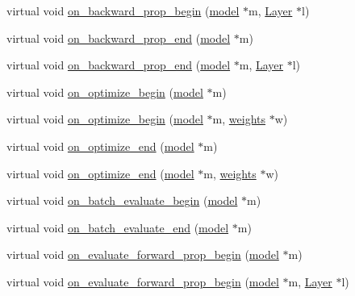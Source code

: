 \begin{DoxyCompactItemize}
\item 
virtual void \hyperlink{classlbann_1_1lbann__callback_abeb1e486e259fd358332abf1e952f630}{on\+\_\+backward\+\_\+prop\+\_\+begin} (\hyperlink{classlbann_1_1model}{model} $\ast$m, \hyperlink{classlbann_1_1Layer}{Layer} $\ast$l)
\item 
virtual void \hyperlink{classlbann_1_1lbann__callback_af183624e63ba65e0003fa988f53dee0c}{on\+\_\+backward\+\_\+prop\+\_\+end} (\hyperlink{classlbann_1_1model}{model} $\ast$m)
\item 
virtual void \hyperlink{classlbann_1_1lbann__callback_aba03b59c056ace8094095c08e39b9ac4}{on\+\_\+backward\+\_\+prop\+\_\+end} (\hyperlink{classlbann_1_1model}{model} $\ast$m, \hyperlink{classlbann_1_1Layer}{Layer} $\ast$l)
\item 
virtual void \hyperlink{classlbann_1_1lbann__callback_a1a9248b305f06419889c1b3b0f0893d8}{on\+\_\+optimize\+\_\+begin} (\hyperlink{classlbann_1_1model}{model} $\ast$m)
\item 
virtual void \hyperlink{classlbann_1_1lbann__callback_a497e750da160e0071ce8864ccc3a1344}{on\+\_\+optimize\+\_\+begin} (\hyperlink{classlbann_1_1model}{model} $\ast$m, \hyperlink{classlbann_1_1weights}{weights} $\ast$w)
\item 
virtual void \hyperlink{classlbann_1_1lbann__callback_a235195d5fa4461835b861a03a5c0278f}{on\+\_\+optimize\+\_\+end} (\hyperlink{classlbann_1_1model}{model} $\ast$m)
\item 
virtual void \hyperlink{classlbann_1_1lbann__callback_a4653e2903bfd3903709a81eaf7eabc1a}{on\+\_\+optimize\+\_\+end} (\hyperlink{classlbann_1_1model}{model} $\ast$m, \hyperlink{classlbann_1_1weights}{weights} $\ast$w)
\item 
virtual void \hyperlink{classlbann_1_1lbann__callback_a3462e54126adbd0082c22c98d8de5468}{on\+\_\+batch\+\_\+evaluate\+\_\+begin} (\hyperlink{classlbann_1_1model}{model} $\ast$m)
\item 
virtual void \hyperlink{classlbann_1_1lbann__callback_ad10891b8ab3de74ee1a70e6255e7d58a}{on\+\_\+batch\+\_\+evaluate\+\_\+end} (\hyperlink{classlbann_1_1model}{model} $\ast$m)
\item 
virtual void \hyperlink{classlbann_1_1lbann__callback_a4a2cff48a688bb56ed14b8b53344f945}{on\+\_\+evaluate\+\_\+forward\+\_\+prop\+\_\+begin} (\hyperlink{classlbann_1_1model}{model} $\ast$m)
\item 
virtual void \hyperlink{classlbann_1_1lbann__callback_a044174864e4981a1dac093d58e8c4d6c}{on\+\_\+evaluate\+\_\+forward\+\_\+prop\+\_\+begin} (\hyperlink{classlbann_1_1model}{model} $\ast$m, \hyperlink{classlbann_1_1Layer}{Layer} $\ast$l)

\end{DoxyCompactItemize}
